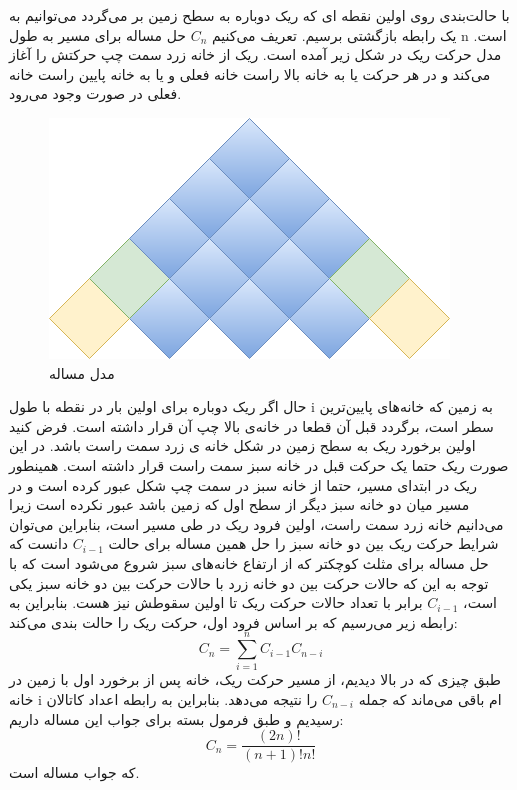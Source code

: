 \p
با حالت‌بندی روی اولین نقطه ای که ریک دوباره به سطح زمین بر می‌گردد می‌توانیم به یک رابطه بازگشتی برسیم. تعریف می‌کنیم \(C_n\) حل مساله برای مسیر به طول n است. مدل حرکت ریک در شکل زیر آمده است. ریک از خانه زرد سمت چپ حرکتش را آغاز می‌کند و در هر حرکت یا به خانه بالا راست خانه فعلی و یا به خانه پایین راست خانه فعلی در صورت وجود می‌رود.
\begin{figure}[h!]
    \centering
    \includegraphics[width=0.2\linewidth]{DMsoal3.png}
    		\caption{مدل مساله}
\end{figure}
حال اگر ریک دوباره برای اولین بار در نقطه با طول i به زمین که خانه‌های پایین‌ترین سطر است، برگردد قبل آن قطعا در خانه‌ی بالا چپ آن قرار داشته است. فرض کنید اولین برخورد ریک به سطح زمین در شکل خانه ی زرد سمت راست باشد. در این صورت ریک حتما یک حرکت قبل در خانه سبز سمت راست قرار داشته است. همینطور ریک در ابتدای مسیر، حتما از خانه سبز در سمت چپ شکل عبور کرده است و در مسیر میان دو خانه سبز دیگر از سطح اول که زمین باشد عبور نکرده است زیرا می‌دانیم خانه زرد سمت راست، اولین فرود ریک در طی مسیر است، بنابراین می‌توان شرایط حرکت ریک بین دو خانه سبز را حل همین مساله برای حالت \(C_{i-1}\) دانست که حل مساله برای مثلث کوچکتر که از ارتفاع خانه‌های سبز شروع می‌شود است که با توجه به این که حالات حرکت بین دو خانه زرد با حالات حرکت بین دو خانه سبز یکی است، \(C_{i-1}\) برابر با تعداد حالات حرکت ریک تا اولین سقوطش نیز هست. بنابراین به رابطه زیر می‌رسیم که بر اساس فرود اول، حرکت ریک را حالت بندی می‌کند:
\[ C_n = \sum\limits_{i=1}^{n} C_{i-1}C_{n-i} \]طبق چیزی که در بالا دیدیم، از مسیر حرکت ریک،  خانه پس از برخورد اول با زمین در خانه i ام باقی می‌ماند که جمله \(C_{n-i}\) را نتیجه می‌دهد. بنابراین به رابطه اعداد کاتالان رسیدیم و طبق فرمول بسته برای جواب این مساله داریم:
\[ C_n = \frac{(2n)!}{(n+1)!n!} \]که جواب مساله است.
  